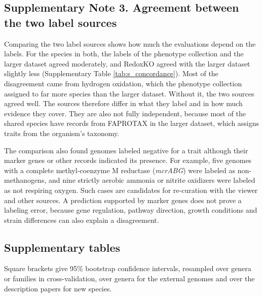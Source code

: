 \documentclass[10pt,a4paper,onecolumn]{article}
\begin{document}
{\subsection{Supplementary Note 3. Agreement between the two label
sources}\label{supplementary-note-3.-agreement-between-the-two-label-sources}

Comparing the two label sources shows how much the evaluations depend on
the labels. For the species in both, the labels of the phenotype
collection and the larger dataset agreed moderately, and RedoxKO agreed
with the larger dataset slightly less (Supplementary Table
\ref{tab:s_concordance}). Most of the disagreement came from hydrogen
oxidation, which the phenotype collection assigned to far more species
than the larger dataset. Without it, the two sources agreed well. The
sources therefore differ in what they label and in how much evidence
they cover. They are also not fully independent, because most of the
shared species have records from FAPROTAX in the larger dataset, which
assigns traits from the organism's taxonomy.

The comparison also found genomes labeled negative for a trait although
their marker genes or other records indicated its presence. For example,
five genomes with a complete methyl-coenzyme M reductase (\emph{mcrABG})
were labeled as non-methanogens, and nine strictly aerobic ammonia or
nitrite oxidizers were labeled as not respiring oxygen. Such cases are
candidates for re-curation with the viewer and other sources. A
prediction supported by marker genes does not prove a labeling error,
because gene regulation, pathway direction, growth conditions and strain
differences can also explain a disagreement.

\subsection{Supplementary tables}\label{supplementary-tables}

Square brackets give 95\% bootstrap confidence intervals, resampled over
genera or families in cross-validation, over genera for the external
genomes and over the description papers for new species.

\begingroup{}\small\renewcommand{\arraystretch}{1.35}\setlength{\tabcolsep}{5pt}

}
\end{document}
